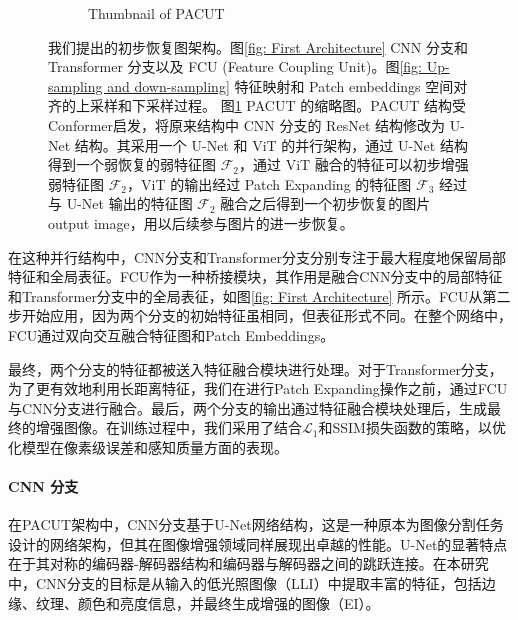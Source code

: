 \documentclass[a4paper]{ctexart}
\begin{document}
\begin{figure}[htb]
\begin{subfigure}{0.4\textwidth}
			\captionsetup{font=scriptsize}
			\caption{Thumbnail of PACUT}
			\label{fig: The proposed initial architecture(Abstract Picture)}	
		\end{subfigure}
		\caption{
			\label{fig: PACUT}
			我们提出的初步恢复图架构。图\ref{fig: First Architecture} CNN 分支和 Transformer 分支以及 FCU (Feature Coupling Unit)。图\ref{fig: Up-sampling and down-sampling} 特征映射和 Patch embeddings 空间对齐的上采样和下采样过程。 图\ref{fig: The proposed initial architecture(Abstract Picture)} PACUT 的缩略图。PACUT 结构受 Conformer\cite{peng2021conformer}启发，将原来结构中 CNN 分支的 ResNet 结构修改为 U-Net 结构。其采用一个 U-Net 和 ViT 的并行架构，通过 U-Net 结构得到一个弱恢复的弱特征图 $\mathcal{F}_2$，通过 ViT 融合的特征可以初步增强弱特征图 $\mathcal{F}_2$，ViT 的输出经过 Patch Expanding 的特征图 $\mathcal{F}_3$ 经过与 U-Net 输出的特征图 $\mathcal{F}_2$ 融合之后得到一个初步恢复的图片 output image，用以后续参与图片的进一步恢复。
		}
	\end{figure}
	\FloatBarrier
	
	在这种并行结构中，CNN分支和Transformer分支分别专注于最大程度地保留局部特征和全局表征。FCU作为一种桥接模块，其作用是融合CNN分支中的局部特征和Transformer分支中的全局表征，如图\ref{fig: First Architecture} 所示。FCU从第二步开始应用，因为两个分支的初始特征虽相同，但表征形式不同。在整个网络中，FCU通过双向交互融合特征图和Patch Embeddings。
	
	最终，两个分支的特征都被送入特征融合模块进行处理。对于Transformer分支，为了更有效地利用长距离特征，我们在进行Patch Expanding操作之前，通过FCU与CNN分支进行融合。最后，两个分支的输出通过特征融合模块处理后，生成最终的增强图像。在训练过程中，我们采用了结合$\mathcal{L}_1$和SSIM损失函数的策略，以优化模型在像素级误差和感知质量方面的表现。
	
	\paragraph{CNN 分支}
	
	在PACUT架构中，CNN分支基于U-Net网络结构，这是一种原本为图像分割任务设计的网络架构，但其在图像增强领域同样展现出卓越的性能。U-Net的显著特点在于其对称的编码器-解码器结构和编码器与解码器之间的跳跃连接。在本研究中，CNN分支的目标是从输入的低光照图像（LLI）中提取丰富的特征，包括边缘、纹理、颜色和亮度信息，并最终生成增强的图像（EI）。
	
\end{document}
